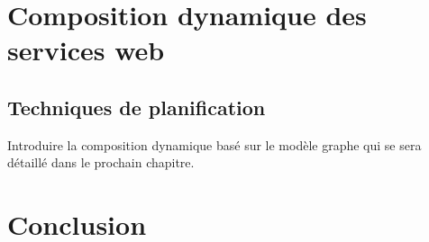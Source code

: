     \newpage
    \newpage

  \section{Composition dynamique des services web}
  \label{sec:comp-dynam}

    \subsection{Techniques de planification}
    \cite{bartalos2011effective}
    \label{sec:techn-de-plan}

  Introduire la composition dynamique basé sur le modèle graphe qui se
  sera détaillé dans le prochain chapitre.
  \section{Conclusion}
  \label{sec:conclusion}
 

